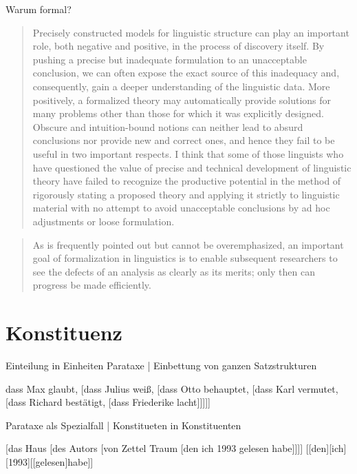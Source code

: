 \begin{frame}
  {Warum formal?}
  \begin{quote}\small
    Precisely constructed models for linguistic structure can play an
    important role, both negative and positive, in the process of discovery 
    itself. By pushing a precise but inadequate formulation to
    an unacceptable conclusion, we can often \alert{expose the exact source
    of this inadequacy and, consequently, gain a deeper understanding}
    of the linguistic data. More positively, a formalized theory may 
    \alert{automatically provide solutions for many problems other than those
    for which it was explicitly designed}. Obscure and intuition-bound
    notions can neither lead to absurd conclusions nor provide new and
    correct ones, and hence they fail to be useful in two important respects. 
    I think that some of those linguists who have questioned
    the value of precise and technical development of linguistic theory
    have failed to recognize the productive potential in the method
    of rigorously stating a proposed theory and applying it strictly to
    linguistic material with no attempt to avoid unacceptable conclusions by ad hoc adjustments or loose formulation.
\citep[S.\,5]{Chomsky57a}
  \end{quote}
  \onslide<+->
  \Halbzeile
  \begin{quote}\small
    As is frequently pointed out but cannot be overemphasized, an important goal
    of formalization in linguistics is to \alert{enable subsequent researchers to see the defects
    of an analysis as clearly as its merits}; only then can progress be made efficiently.
    \citep[S.\,322]{Dowty79a}
  \end{quote}
\end{frame}


\section{Konstituenz}

\begin{frame}
  {Einteilung in Einheiten}
  \onslide<+->
  \onslide<+->
  \alert{Parataxe} | Einbettung von ganzen Satzstrukturen\\
  \Viertelzeile
  \begin{exe}
    \ex dass Max glaubt, [dass Julius weiß, [dass Otto behauptet, [dass Karl vermutet, [dass Richard bestätigt, [dass Friederike lacht]]]]]
  \end{exe}
  \onslide<+->
  \Zeile
  Parataxe als Spezialfall | \alert{Konstitueten in Konstituenten}\\
  \Viertelzeile
  \begin{exe}
    \ex {}[das Haus [des Autors [von Zettel Traum [den ich 1993 gelesen habe]]]]
    \ex {}[[den][ich][1993][[gelesen]habe]]
  \end{exe}
\end{frame}

